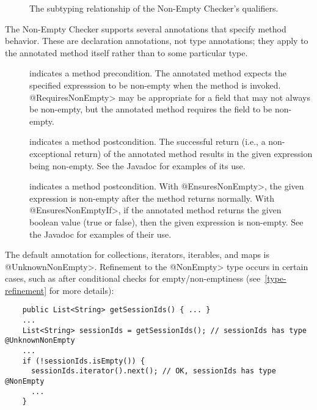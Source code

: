 \begin{figure}
\caption{The subtyping relationship of the Non-Empty Checker's qualifiers.}
\label{fig-nonempty-hierarchy}
\end{figure}


The Non-Empty Checker supports several annotations that specify method
behavior.  These are declaration annotations, not type annotations;  they
apply to the annotated method itself rather than to some particular type.

\begin{description}

\item[]
  indicates a method precondition.  The annotated method expects the
  specified expresssion to be non-empty when the
  method is invoked. \<@RequiresNonEmpty> may be appropriate for
  a field that may not always be non-empty, but the annotated method requires
  the field to be non-empty.

\item[]
  indicates a method postcondition. The successful return (i.e., a
  non-exceptional return) of the annotated method results in the given
  expression being non-empty. See the Javadoc for examples of its use.

\item[]
  indicates a method postcondition.  With \<@EnsuresNonEmpty>, the given
  expression is non-empty after the method returns normally.  With
  \<@EnsuresNonEmptyIf>, if the annotated
  method returns the given boolean value (true or false), then the given
  expression is non-empty. See the Javadoc for examples of their use.

\end{description}


The default annotation for collections, iterators, iterables, and maps is
\<@UnknownNonEmpty>.
Refinement to the \<@NonEmpty> type occurs in certain cases, such as after
conditional checks for empty/non-emptiness (see~\ref{type-refinement} for
more details):

\begin{Verbatim}
    public List<String> getSessionIds() { ... }
    ...
    List<String> sessionIds = getSessionIds(); // sessionIds has type @UnknownNonEmpty
    ...
    if (!sessionIds.isEmpty()) {
      sessionIds.iterator().next(); // OK, sessionIds has type @NonEmpty
      ...
    }
\end{Verbatim}


